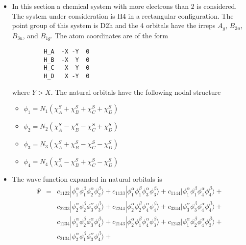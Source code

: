 \documentclass[aip,graphicx]{revtex4-1}
\begin{document}
\begin{itemize}
\item In this section a chemical system with more electrons than 2 is considered. 
         The system under consideration is H4 in a rectangular configuration. 
         The point group of this system is D2h and the 4 orbitals have the irreps $A_g$,
         $B_{2u}$, $B_{3u}$, and $B_{1g}$.
         The atom coordinates are of the form
         \begin{verbatim}
         H_A  -X -Y  0
         H_B  -X  Y  0
         H_C   X  Y  0
         H_D   X -Y  0
         \end{verbatim}
         where $Y > X$.
         The natural orbitals have the following nodal structure
         \begin{itemize}
         \item $\phi_1 = N_1\left(\chi_A^S + \chi_B^S + \chi_C^S + \chi_D^S\right)$
         \item $\phi_2 = N_2\left(\chi_A^S - \chi_B^S - \chi_C^S + \chi_D^S\right)$
         \item $\phi_3 = N_3\left(\chi_A^S + \chi_B^S - \chi_C^S - \chi_D^S\right)$
         \item $\phi_4 = N_4\left(\chi_A^S - \chi_B^S + \chi_C^S - \chi_D^S\right)$
         \end{itemize}
\item The wave function expanded in natural orbitals is
         \begin{eqnarray}
         \Psi &=& c_{1122}|\phi_1^\alpha\phi_1^\beta\phi_2^\alpha\phi_2^\beta\rangle +
                        c_{1133}|\phi_1^\alpha\phi_1^\beta\phi_3^\alpha\phi_3^\beta\rangle +
                        c_{1144}|\phi_1^\alpha\phi_1^\beta\phi_4^\alpha\phi_4^\beta\rangle + \nonumber\\
                 &&  c_{2233}|\phi_2^\alpha\phi_2^\beta\phi_3^\alpha\phi_3^\beta\rangle +
                        c_{2244}|\phi_2^\alpha\phi_2^\beta\phi_4^\alpha\phi_4^\beta\rangle +
                        c_{3344}|\phi_3^\alpha\phi_3^\beta\phi_4^\alpha\phi_4^\beta\rangle + \nonumber\\
                 &&  c_{1234}|\phi_1^\alpha\phi_2^\beta\phi_3^\alpha\phi_4^\beta\rangle +
                        c_{2143}|\phi_2^\alpha\phi_1^\beta\phi_4^\alpha\phi_3^\beta\rangle + 
                        c_{1243}|\phi_1^\alpha\phi_2^\beta\phi_4^\alpha\phi_3^\beta\rangle + \nonumber\\
                 &&  c_{2134}|\phi_2^\alpha\phi_1^\beta\phi_3^\alpha\phi_4^\beta\rangle + 

\end{eqnarray}
\end{itemize}
\end{document}
